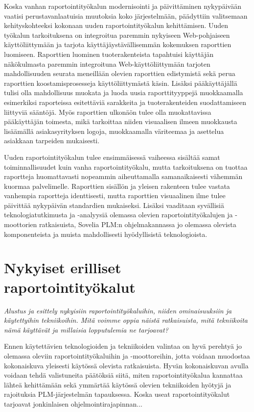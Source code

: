 Koska vanhan raportointityökalun modernisointi ja päivittäminen nykypäivään vaatisi perustavanlaatuisia muutoksia koko järjestelmään, päädyttiin valitsemaan kehityskohteeksi kokonaan uuden raportointityökalun kehittämisen. Uuden työkalun tarkoituksena on integroitua paremmin nykyiseen Web-pohjaiseen käyttöliittymään ja tarjota käyttäjäystävällisemmän kokemuksen raporttien luomiseen. Raporttien luominen tuoterakenteista tapahtuisi käyttäjän näkökulmasta paremmin integroituna Web-käyttöliittymään tarjoten mahdollisuuden seurata meneillään olevien raporttien edistymistä sekä perua raporttien koostamisprosesseja käyttöliittymästä käsin. Lisäksi pääkäyttäjällä tulisi olla mahdollisuus muokata ja luoda uusia raporttityyppejä muokkaamalla esimerkiksi raporteissa esitettäviä sarakkeita ja tuoterakenteiden suodattamiseen liittyviä sääntöjä. Myös raporttien ulkonäön tulee olla muokattavissa pääkäyttäjän toimesta, mikä tarkoittaa niiden visuaalisen ilmeen muokkausta lisäämällä asiakasyrityksen logoja, muokkaamalla väriteemaa ja asettelua asiakkaan tarpeiden mukaisesti.

Uuden raportointityökalun tulee ensimmäisessä vaiheessa sisältää samat toiminnallisuudet kuin vanha raportointityökalu, mutta tarkoituksena on tuottaa raportteja huomattavasti nopeammin aiheuttamalla samanaikaisesti vähemmän kuormaa palvelimelle. Raporttien sisällön ja yleisen rakenteen tulee vastata vanhempia raportteja identtisesti, mutta raporttien visuaalinen ilme tulee päivittää nykypäivän standardien mukaiseksi. Lisäksi vaaditaan syvällisiä teknologiatutkimusta ja -analyysiä olemassa olevien raportointityökalujen ja -moottorien ratkaisuista, Sovelia PLM:n ohjelmakannassa jo olemassa olevista komponenteista ja muista mahdollisesti hyödyllisistä teknologioista.

\section{Nykyiset erilliset raportointityökalut}

\textit{Alustus ja esittely nykyisiin raportointityökaluihin, niiden ominaisuuksiin ja käytettyihin tekniikoihin. Mitä voimme oppia näistä ratkaisuista, mitä tekniikoita nämä käyttävät ja millaisia lopputulemia ne tarjoavat?}

Ennen käytettävien teknologioiden ja tekniikoiden valintaa on hyvä perehtyä jo olemassa oleviin raportointityökaluihin ja -moottoreihin, jotta voidaan muodostaa kokonaiskuva yleisesti käytössä olevista ratkaisuista. Hyvän kokonaiskuvan avulla voidaan tehdä valistuneita päätöksiä siitä, miten raportointityökalua kannattaa lähteä kehittämään sekä ymmärtää käytössä olevien tekniikoiden hyötyjä ja rajoituksia PLM-järjestelmän tapauksessa. Koska useat raportointityökalut tarjoavat jonkinlaisen ohjelmointirajapinnan...

